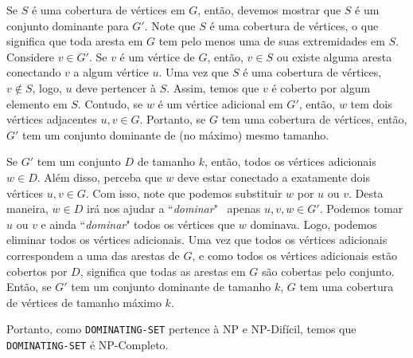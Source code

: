 \documentclass[]{article}
\begin{document}
Se $S$ é uma cobertura de vértices em $G$, então, devemos mostrar que $S$ é um conjunto dominante para $G'$. Note que $S$ é uma cobertura de vértices, o que significa que toda aresta em $G$ tem pelo menos uma de suas extremidades em $S$. Considere $v \in  G'$. Se $v$ é um vértice de $G$, então, $v \in S$ ou existe alguma aresta conectando $v$ a algum vértice $u$. Uma vez que $S$ é uma cobertura de vértices, $v \notin S$, logo, $u$ deve pertencer à $S$. Assim, temos que $v$ é coberto por algum elemento em $S$. Contudo, se $w$ é um vértice adicional em $G'$, então, $w$ tem dois vértices adjacentes $u, v \in G$. Portanto, se $G$ tem uma cobertura de vértices, então, $G'$ tem um conjunto dominante de (no máximo) mesmo tamanho.

Se $G'$ tem um conjunto $D$ de tamanho $k$, então, todos os vértices adicionais $w \in D$. Além disso, perceba que $w$ deve estar conectado a exatamente dois vértices $u, v \in G$. Com isso, note que podemos substituir $w$ por $u$ ou $v$. Desta maneira, $w \in D$ irá nos ajudar a ``\textit{dominar}" \, apenas $u, v, w \in G'$. Podemos tomar $u$ ou $v$ e ainda ``\textit{dominar}" todos os vértices que $w$ dominava. Logo, podemos eliminar todos os vértices adicionais. Uma vez que todos os vértices adicionais correspondem a uma das arestas de $G$, e como todos os vértices adicionais estão cobertos por $D$, significa que todas as arestas em $G$ são cobertas pelo conjunto. Então, se $G'$ tem um conjunto dominante de tamanho $k$, $G$ tem uma cobertura de vértices de tamanho máximo $k$.

Portanto, como \texttt{DOMINATING-SET} pertence à NP e NP-Difícil, temos que \texttt{DOMINATING-SET} é NP-Completo.
\end{document}
